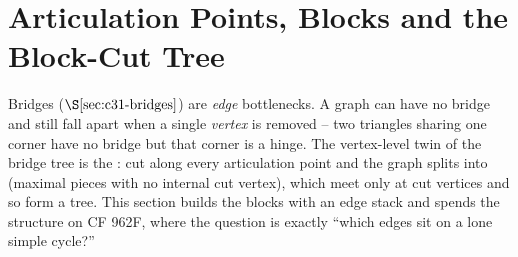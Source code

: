 \section{Articulation Points, Blocks and the Block-Cut Tree}\label{sec:c31-block}

\begin{previouslybox}
Bridges (\(\secref{c31-bridges}\)) are \emph{edge} bottlenecks.  A graph can have
no bridge and still fall apart when a single \emph{vertex} is removed -- two
triangles sharing one corner have no bridge but that corner is a hinge.  The
vertex-level twin of the bridge tree is the : cut along every
articulation point and the graph splits into  (maximal pieces with no
internal cut vertex), which meet only at cut vertices and so form a tree.  This
section builds the blocks with an edge stack and spends the structure on CF 962F,
where the question is exactly ``which edges sit on a lone simple cycle?''
\end{previouslybox}

